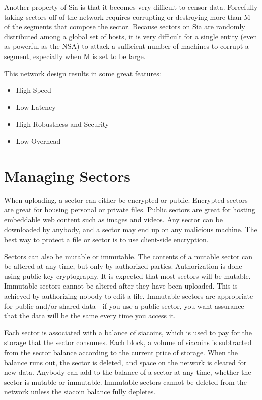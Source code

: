 \documentclass[twocolumn]{article}
\begin{document}
Another property of Sia is that it becomes very difficult to censor data.
Forcefully taking sectors off of the network requires corrupting or destroying more than M of the \quorumsize{} segments that compose the sector.
Because sectors on Sia are randomly distributed among a global set of hosts, it is very difficult for a single entity (even as powerful as the NSA) to attack a sufficient number of machines to corrupt a segment, especially when M is set to be large.

This network design results in some great features:
\begin{itemize}
	\item High Speed
	\item Low Latency
	\item High Robustness and Security
	\item Low Overhead
\end{itemize}

\section{Managing Sectors}

When uploading, a sector can either be encrypted or public.
Encrypted sectors are great for housing personal or private files.
Public sectors are great for hosting embeddable web content such as images and videos.
Any sector can be downloaded by anybody, and a sector may end up on any malicious machine.
The best way to protect a file or sector is to use client-side encryption.

Sectors can also be mutable or immutable.
The contents of a mutable sector can be altered at any time, but only by authorized parties.
Authorization is done using public key cryptography.
It is expected that most sectors will be mutable.
Immutable sectors cannot be altered after they have been uploaded.
This is achieved by authorizing nobody to edit a file.
Immutable sectors are appropriate for public and/or shared data - if you use a public sector, you want assurance that the data will be the same every time you access it.

Each sector is associated with a balance of siacoins, which is used to pay for the storage that the sector consumes.
Each block, a volume of siacoins is subtracted from the sector balance according to the current price of storage.
When the balance runs out, the sector is deleted, and space on the network is cleared for new data.
Anybody can add to the balance of a sector at any time, whether the sector is mutable or immutable.
Immutable sectors cannot be deleted from the network unless the siacoin balance fully depletes.
\end{document}
